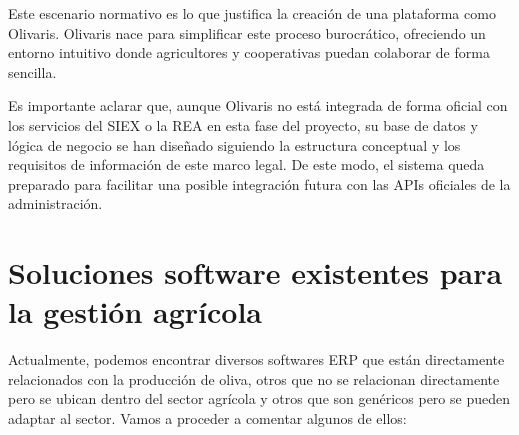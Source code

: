 Este escenario normativo es lo que justifica la creación de una plataforma como Olivaris. Olivaris nace para simplificar este proceso burocrático, ofreciendo un entorno intuitivo donde agricultores y cooperativas 
puedan colaborar de forma sencilla.

Es importante aclarar que, aunque Olivaris no está integrada de forma oficial con los servicios del SIEX o la REA en esta fase del proyecto, su base de datos y lógica de negocio se han diseñado siguiendo la estructura 
conceptual y los requisitos de información de este marco legal. De este modo, el sistema queda preparado para facilitar una posible integración futura con las APIs oficiales de la administración.

\section{Soluciones software existentes para la gestión agrícola}

Actualmente, podemos encontrar diversos softwares ERP que están directamente relacionados con la producción de oliva,
otros que no se relacionan directamente pero se ubican dentro del sector agrícola y otros que son genéricos pero se 
pueden adaptar al sector. Vamos a proceder a comentar algunos de ellos:

